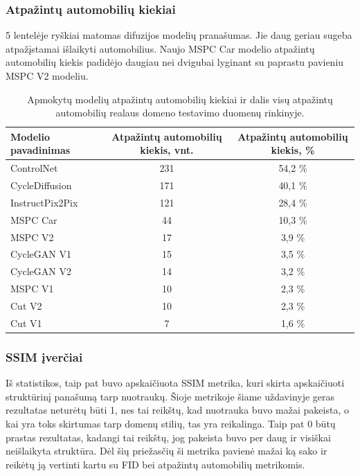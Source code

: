 \documentclass{VUMIFPSbakalaurinis}
\begin{document}
        \subsubsection{Atpažintų automobilių kiekiai}
            5 lentelėje ryškiai matomas difuzijos modelių pranašumas. Jie daug geriau sugeba atpažįstamai išlaikyti automobilius. Naujo MSPC Car modelio atpažintų automobilių kiekis padidėjo daugiau nei dvigubai lyginant su paprastu pavieniu MSPC V2 modeliu.
        
            \begin{table}[H]
                \footnotesize
                \centering
                \caption{Apmokytų modelių atpažintų automobilių kiekiai ir dalis visų atpažintų automobilių realaus domeno testavimo duomenų rinkinyje.}
                {\begin{tabular}{|l|c|c|} \hline
                    Modelio pavadinimas & Atpažintų automobilių kiekis, vnt. & Atpažintų automobilių kiekis, \% \\
                    \hline
                    ControlNet & 231 & 54,2 \%\\ %
                    CycleDiffusion & 171 & 40,1 \% \\ %
                    InstructPix2Pix & 121 & 28,4 \%\\ %
                    MSPC Car & 44 & 10,3 \%\\ %
                    MSPC V2 & 17 & 3,9 \%\\
                    CycleGAN V1 & 15 & 3,5 \%\\
                    CycleGAN V2 & 14 & 3,2 \%\\
                    MSPC V1 & 10 & 2,3 \%\\
                    Cut V2 & 10 & 2,3 \%\\ 
                    Cut V1 & 7 & 1,6 \%\\
                    \hline
                    \end{tabular}
                }
                \label{tab:table example}
            \end{table}

        \subsubsection{SSIM įverčiai}
            Iš statistikos, taip pat buvo apskaičiuota SSIM metrika, kuri skirta apskaičiuoti struktūrinį panašumą tarp nuotraukų. Šioje metrikoje šiame uždavinyje geras rezultatas neturėtų būti 1, nes tai reikštų, kad nuotrauka buvo mažai pakeista, o kai yra toks skirtumas tarp domenų stilių, tas yra reikalinga. Taip pat 0 būtų prastas rezultatas, kadangi tai reikštų, jog pakeista buvo per daug ir visiškai neišlaikyta struktūra. Dėl šių priežasčių ši metrika pavienė mažai ką sako ir reikėtų ją vertinti kartu su FID bei atpažintų automobilių metrikomis. 
            
\end{document}
